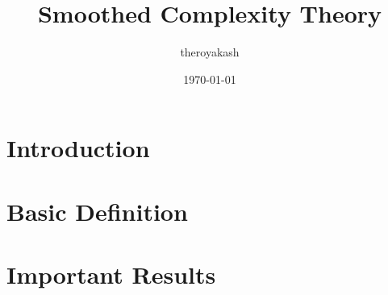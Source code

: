 \documentclass[aspectratio=169, compress]{beamer}
\title[Smoothed Complexity Theory \hspace{0.5cm}\insertframenumber/\inserttotalframenumber]{Smoothed Complexity Theory}
\institute{\textsc{Indian Institute of Technology Madras}}
\author{theroyakash}
\date{\today{}}
\begin{document}
\maketitle


\section{Introduction}


\section{Basic Definition}


\section{Important Results}

\end{document}
